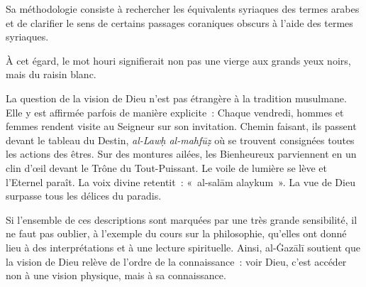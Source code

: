 Sa méthodologie consiste à rechercher les équivalents syriaques des
termes arabes et de clarifier le sens de certains passages coraniques
obscurs à l'aide des termes syriaques.

À cet égard, le mot houri signifierait non pas une vierge aux grands
yeux noirs, mais du raisin blanc.


La question de la vision de Dieu n'est pas étrangère à la tradition
musulmane. Elle y est affirmée parfois de manière explicite~: Chaque
vendredi, hommes et femmes rendent visite au Seigneur sur son
invitation. Chemin faisant, ils passent devant le tableau du Destin,
\emph{al-Lawḥ al-mahfūẓ} où se trouvent consignées toutes les actions
des êtres. Sur des montures ailées, les Bienheureux parviennent en un
clin d'œil devant le Trône du Tout-Puissant. Le voile de lumière se lève
et l'Eternel paraît. La voix divine retentit~: «~al-salām alaykum~». La
vue de Dieu surpasse tous les délices du paradis.

Si l'ensemble de ces descriptions sont marquées par une très grande
sensibilité, il ne faut pas oublier, à l'exemple du cours sur la
philosophie, qu'elles ont donné lieu à des interprétations et à une
lecture spirituelle. Ainsi, al-Ġazālī soutient que la vision de Dieu
relève de l'ordre de la connaissance~: voir Dieu, c'est accéder non à
une vision physique, mais à sa connaissance.
